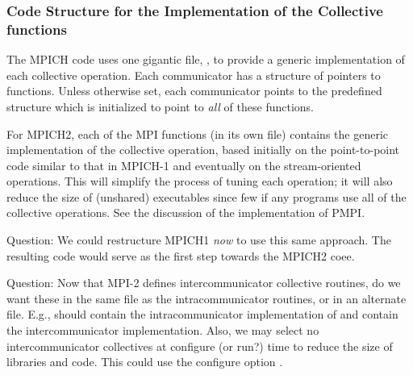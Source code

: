 

\subsubsection{Code Structure for the Implementation of the Collective
  functions} 

The MPICH code uses one gigantic file, , to provide a
generic implementation of each collective operation.  Each
communicator has a structure of pointers to functions.  Unless
otherwise set, each communicator points to the predefined structure
 which is
initialized to point to \emph{all} of 
these functions.  

For MPICH2, each of the MPI functions (in its own file) contains the generic
implementation of the collective operation, based initially on the
point-to-point code similar to that in MPICH-1 and eventually on the
stream-oriented operations.  This will simplify the process of tuning each
operation; it will also reduce the size of (unshared) executables since few if
any programs use all of the collective operations.
See the discussion of the implementation of PMPI.

Question: We could restructure MPICH1 \emph{now} to use this same
approach.  The resulting code would serve as the first step towards
the MPICH2 coee.

Question: Now that MPI-2 defines intercommunicator collective
routines, do we want these in the same file as the intracommunicator
routines, or in an alternate file.  E.g., should  contain
the intracommunicator implementation of  and
 contain the intercommunicator implementation.
Also, we may select no intercommunicator collectives at configure (or run?)
time to reduce the size of libraries and code.  This could use the
configure option .

